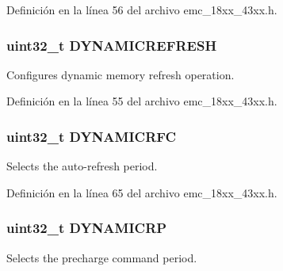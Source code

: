 Definición en la línea 56 del archivo emc\+\_\+18xx\+\_\+43xx.\+h.

\subsubsection[{\texorpdfstring{D\+Y\+N\+A\+M\+I\+C\+R\+E\+F\+R\+E\+SH}{DYNAMICREFRESH}}]{ uint32\+\_\+t D\+Y\+N\+A\+M\+I\+C\+R\+E\+F\+R\+E\+SH}\hypertarget{struct_l_p_c___e_m_c___t_a5debd6e13c44b10021d5230d3d2393d4}{}\label{struct_l_p_c___e_m_c___t_a5debd6e13c44b10021d5230d3d2393d4}
Configures dynamic memory refresh operation. 

Definición en la línea 55 del archivo emc\+\_\+18xx\+\_\+43xx.\+h.

\subsubsection[{\texorpdfstring{D\+Y\+N\+A\+M\+I\+C\+R\+FC}{DYNAMICRFC}}]{ uint32\+\_\+t D\+Y\+N\+A\+M\+I\+C\+R\+FC}\hypertarget{struct_l_p_c___e_m_c___t_a32c496d83a0d74150944bd5a7649365f}{}\label{struct_l_p_c___e_m_c___t_a32c496d83a0d74150944bd5a7649365f}
Selects the auto-\/refresh period. 

Definición en la línea 65 del archivo emc\+\_\+18xx\+\_\+43xx.\+h.

\subsubsection[{\texorpdfstring{D\+Y\+N\+A\+M\+I\+C\+RP}{DYNAMICRP}}]{ uint32\+\_\+t D\+Y\+N\+A\+M\+I\+C\+RP}\hypertarget{struct_l_p_c___e_m_c___t_a88ed239d4cca54a191bf12fb97cdb198}{}\label{struct_l_p_c___e_m_c___t_a88ed239d4cca54a191bf12fb97cdb198}
Selects the precharge command period. 

